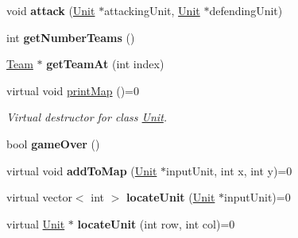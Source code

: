 \begin{DoxyCompactItemize}
\item 
\hypertarget{class_game_master_a239b8bfa602f34cfcf1a3b69342113eb}{}void {\bfseries attack} (\hyperlink{class_unit}{Unit} $\ast$attacking\+Unit, \hyperlink{class_unit}{Unit} $\ast$defending\+Unit)\label{class_game_master_a239b8bfa602f34cfcf1a3b69342113eb}

\item 
\hypertarget{class_game_master_a848a9cad15b3eaa3140de9e6e1eb814f}{}int {\bfseries get\+Number\+Teams} ()\label{class_game_master_a848a9cad15b3eaa3140de9e6e1eb814f}

\item 
\hypertarget{class_game_master_aba8dd56864ebdfd1f9648603b09dd4fc}{}\hyperlink{class_team}{Team} $\ast$ {\bfseries get\+Team\+At} (int index)\label{class_game_master_aba8dd56864ebdfd1f9648603b09dd4fc}

\item 
\hypertarget{class_game_master_a6f3ab165ceb26a36882e143bc812fa65}{}virtual void \hyperlink{class_game_master_a6f3ab165ceb26a36882e143bc812fa65}{print\+Map} ()=0\label{class_game_master_a6f3ab165ceb26a36882e143bc812fa65}

\begin{DoxyCompactList}\small\item\em Virtual destructor for class \hyperlink{class_unit}{Unit}. \end{DoxyCompactList}\item 
\hypertarget{class_game_master_ace106701f0de9e40c4afb5560a195c5a}{}bool {\bfseries game\+Over} ()\label{class_game_master_ace106701f0de9e40c4afb5560a195c5a}

\item 
\hypertarget{class_game_master_adfe69afcac63471423e0cbf1a2cabbef}{}virtual void {\bfseries add\+To\+Map} (\hyperlink{class_unit}{Unit} $\ast$input\+Unit, int x, int y)=0\label{class_game_master_adfe69afcac63471423e0cbf1a2cabbef}

\item 
\hypertarget{class_game_master_a023467341bb0685667cb3e907dcb0324}{}virtual vector$<$ int $>$ {\bfseries locate\+Unit} (\hyperlink{class_unit}{Unit} $\ast$input\+Unit)=0\label{class_game_master_a023467341bb0685667cb3e907dcb0324}

\item 
\hypertarget{class_game_master_ae759209b7eaa2fc9612b510ad6e40c3c}{}virtual \hyperlink{class_unit}{Unit} $\ast$ {\bfseries locate\+Unit} (int row, int col)=0\label{class_game_master_ae759209b7eaa2fc9612b510ad6e40c3c}


\end{DoxyCompactItemize}
